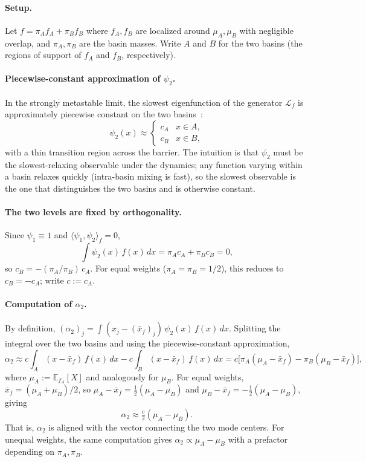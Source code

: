 \documentclass{article}
\newcommand{\E}{\mathbb{E}}
\begin{document}
\paragraph{Setup.} Let $f = \pi_A f_A + \pi_B f_B$ where $f_A, f_B$ are
localized around $\mu_A, \mu_B$ with negligible overlap, and $\pi_A, \pi_B$
are the basin masses. Write $A$ and $B$ for the two basins (the regions of
support of $f_A$ and $f_B$, respectively).

\paragraph{Piecewise-constant approximation of $\psi_2$.} In the strongly
metastable limit, the slowest eigenfunction of the generator $\mathcal{L}_f$
is approximately piecewise constant on the two basins~\cite{Pavliotis2014}:
\[
\psi_2(x) \approx
\begin{cases} c_A & x \in A, \\ c_B & x \in B, \end{cases}
\]
with a thin transition region across the barrier. The intuition is that
$\psi_2$ must be the slowest-relaxing observable under the dynamics; any
function varying within a basin relaxes quickly (intra-basin mixing is
fast), so the slowest observable is the one that distinguishes the two
basins and is otherwise constant.

\paragraph{The two levels are fixed by orthogonality.} Since
$\psi_1 \equiv 1$ and $\langle \psi_1, \psi_2 \rangle_f = 0$,
\[
\int \psi_2(x)\,f(x)\,dx = \pi_A c_A + \pi_B c_B = 0,
\]
so $c_B = -(\pi_A/\pi_B)\,c_A$. For equal weights ($\pi_A = \pi_B = 1/2$),
this reduces to $c_B = -c_A$; write $c := c_A$.

\paragraph{Computation of $\alpha_2$.} By definition,
$(\alpha_2)_j = \int (x_j - (\bar x_f)_j)\,\psi_2(x)\,f(x)\,dx$. Splitting
the integral over the two basins and using the piecewise-constant
approximation,
\[
\alpha_2 \approx c \int_A (x - \bar x_f)\,f(x)\,dx - c \int_B (x - \bar x_f)\,f(x)\,dx
= c\bigl[\pi_A(\mu_A - \bar x_f) - \pi_B(\mu_B - \bar x_f)\bigr],
\]
where $\mu_A := \E_{f_A}[X]$ and analogously for $\mu_B$. For equal weights,
$\bar x_f = (\mu_A + \mu_B)/2$, so $\mu_A - \bar x_f = \tfrac{1}{2}(\mu_A - \mu_B)$
and $\mu_B - \bar x_f = -\tfrac{1}{2}(\mu_A - \mu_B)$, giving
\[
\alpha_2 \approx \tfrac{c}{2}(\mu_A - \mu_B).
\]
That is, $\alpha_2$ is aligned with the vector connecting the two mode
centers. For unequal weights, the same computation gives
$\alpha_2 \propto \mu_A - \mu_B$ with a prefactor depending on $\pi_A, \pi_B$.
\end{document}
